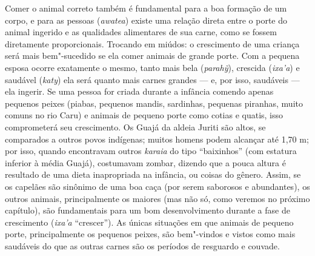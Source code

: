 Comer o animal correto também é fundamental para a boa formação de um
corpo, e para as pessoas (\emph{awatea}) existe uma relação direta entre
o porte do animal ingerido e as qualidades alimentares de sua carne,
como se fossem diretamente proporcionais. Trocando em miúdos: o
crescimento de uma criança será mais bem"-sucedido se ela comer animais
de grande porte. Com a pequena esposa ocorre exatamente o mesmo, tanto
mais bela (\emph{parahỹ}), crescida (\emph{ixa'a}) e saudável
(\emph{katy}) ela será quanto mais carnes grandes --- e, por isso,
saudáveis --- ela ingerir. Se uma pessoa for criada durante a infância
comendo apenas pequenos peixes (piabas, pequenos mandis, sardinhas,
pequenas piranhas, muito comuns no rio Caru) e animais de pequeno porte
como cotias e quatis, isso comprometerá seu crescimento. Os Guajá da
aldeia Juriti são altos, se comparados a outros povos indígenas; muitos
homens podem alcançar até 1,70 m; por isso, quando encontravam outros
\emph{karaia} do tipo ``baixinhos'' (com estatura inferior à média Guajá),
costumavam zombar, dizendo que a pouca altura é resultado de uma dieta
inapropriada na infância, ou coisas do gênero. Assim, se os capelães são
sinônimo de uma boa caça (por serem saborosos e abundantes), os outros
animais, principalmente os maiores (mas não só, como veremos no próximo
capítulo), são fundamentais para um bom desenvolvimento durante a fase
de crescimento (\emph{ixa'a} ``crescer''). As únicas situações em que
animais de pequeno porte, principalmente os pequenos peixes, são
bem"-vindos e vistos como mais saudáveis do que as outras carnes são os
períodos de resguardo e couvade.

